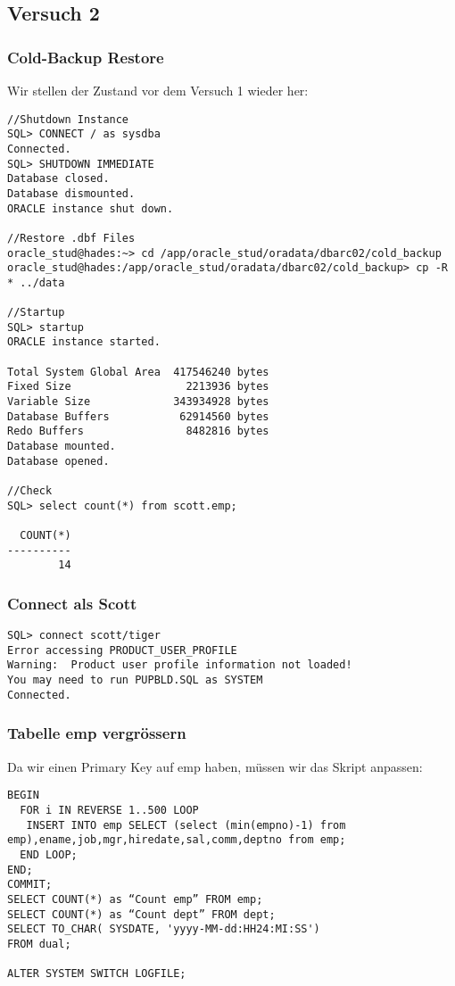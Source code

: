 \documentclass[11pt,a4paper,parskip=half]{scrartcl}
\begin{document}
\subsection{Versuch 2}
\subsubsection{Cold-Backup Restore}
Wir stellen der Zustand vor dem Versuch 1 wieder her:
\begin{lstlisting}
//Shutdown Instance
SQL> CONNECT / as sysdba
Connected.
SQL> SHUTDOWN IMMEDIATE
Database closed.
Database dismounted.
ORACLE instance shut down.

//Restore .dbf Files
oracle_stud@hades:~> cd /app/oracle_stud/oradata/dbarc02/cold_backup
oracle_stud@hades:/app/oracle_stud/oradata/dbarc02/cold_backup> cp -R * ../data

//Startup
SQL> startup
ORACLE instance started.

Total System Global Area  417546240 bytes
Fixed Size                  2213936 bytes
Variable Size             343934928 bytes
Database Buffers           62914560 bytes
Redo Buffers                8482816 bytes
Database mounted.
Database opened.

//Check
SQL> select count(*) from scott.emp;

  COUNT(*)
----------
        14
\end{lstlisting}

\subsubsection{Connect als Scott}
\begin{lstlisting}
SQL> connect scott/tiger
Error accessing PRODUCT_USER_PROFILE
Warning:  Product user profile information not loaded!
You may need to run PUPBLD.SQL as SYSTEM
Connected.
\end{lstlisting}

\subsubsection{Tabelle emp vergrössern}
Da wir einen Primary Key auf emp haben, müssen wir das Skript anpassen:
\begin{lstlisting}
BEGIN
  FOR i IN REVERSE 1..500 LOOP
   INSERT INTO emp SELECT (select (min(empno)-1) from emp),ename,job,mgr,hiredate,sal,comm,deptno from emp;
  END LOOP;
END;
COMMIT;
SELECT COUNT(*) as “Count emp” FROM emp;
SELECT COUNT(*) as “Count dept” FROM dept;
SELECT TO_CHAR( SYSDATE, 'yyyy-MM-dd:HH24:MI:SS')
FROM dual;

ALTER SYSTEM SWITCH LOGFILE;
\end{lstlisting}
\end{document}
